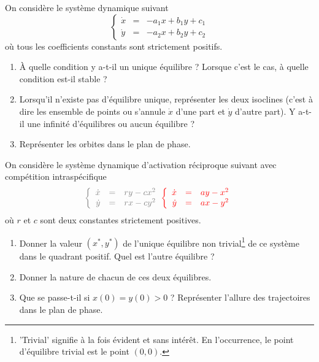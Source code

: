 \begin{exercise} \label{SystDyn-Lineaire}
  On considère le système dynamique suivant
  $$
  \left\{\begin{array}{rcl}
         \dot x & = & -a_1 x + b_1 y + c_1 \\ 
         \dot y & = & -a_2 x + b_2 y + c_2
         \end{array}\right.
  $$
  où tous les coefficients constants sont strictement positifs.
  \begin{enumerate}
   \item À quelle condition y a-t-il un unique équilibre ? Lorsque c’est le cas, à quelle condition est-il stable ?
   \item Lorsqu’il n’existe pas d’équilibre unique, représenter les deux isoclines (c'est à dire les ensemble de points ou s'annule $\dot x$ d'une part et $\dot y$ d'autre part). Y a-t-il une infinité d’équilibres ou aucun équilibre ?
   \item Représenter les orbites dans le plan de phase.
  \end{enumerate}
\end{exercise}

\solution{\todo{}}

\begin{exercise} \label{SystDyn-Quadratique}
  On considère le système dynamique d’activation réciproque suivant avec compétition intraspécifique
  $$
  \SR{
  \left\{\begin{array}{rcl}
         \dot x & = & r y - cx^2 \\ 
         \dot y & = & r x - cy^2 
         \end{array}\right.
  }{
  \left\{\begin{array}{rcl}
         \dot x & = & a y - x^2 \\ 
         \dot y & = & a x - y^2 
         \end{array}\right.
  }
  $$
  où $r$ et $c$ sont deux constantes strictement positives.
  \begin{enumerate}
   \item Donner la valeur $(x^*, y^*)$ de l’unique équilibre non trivial\footnote{'Trivial' signifie à la fois évident et sans intérêt. En l'occurrence, le point d'équilibre trivial est le point $(0, 0)$.} de ce système dans le quadrant positif. Quel est l’autre équilibre ?
   \item Donner la nature de chacun de ces deux équilibres.
   \item Que se passe-t-il si $x(0) = y(0) > 0$ ? Représenter l’allure des trajectoires dans le plan de phase. 
  \solution{\todo{}}
  \end{enumerate}
\end{exercise}

